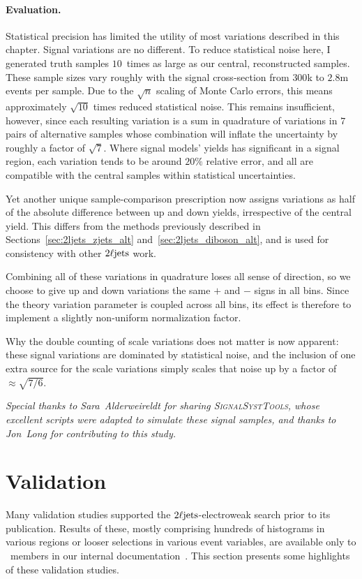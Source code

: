 \paragraph{Evaluation.}
Statistical precision has limited the utility of most variations described in
this chapter.
Signal variations are no different.
To reduce statistical noise here, I generated truth samples $10$~times as large
as our central, reconstructed samples.
These sample sizes vary roughly with the signal cross-section from $300$k to
$2.8$m events per sample.
Due to the $\sqrt{n}$ scaling of Monte Carlo errors, this means approximately
$\sqrt{10}$ times reduced statistical noise.
This remains insufficient, however, since each resulting variation is a
sum in quadrature of variations in $7$ pairs of alternative samples
whose combination will inflate the uncertainty by roughly a factor of
$\sqrt{7}$.
Where signal models' yields has significant in a signal region,
each variation tends to be around $20\%$ relative error,
and all are compatible with the central samples within statistical
uncertainties.

Yet another unique sample-comparison prescription now assigns variations as
half of the absolute difference between up and down yields, irrespective of the
central yield.
This differs from the methods previously described in
Sections~\ref{sec:2ljets_zjets_alt} and~\ref{sec:2ljets_diboson_alt},
and is used for consistency with other $2\ell\mathrm{jets}$ work.

Combining all of these variations in quadrature loses all sense of direction,
so we choose to give up and down variations the same $+$ and $-$ signs in all
bins.
Since the theory variation parameter is coupled across all bins, its effect is
therefore to implement a slightly non-uniform normalization factor.

Why the double counting of scale variations does not matter is now apparent:
these signal variations are dominated by statistical noise, and the inclusion
of one extra source for the scale variations simply scales that noise up by
a factor of $\approx \sqrt{7/6}$.

\emph{%
Special thanks to Sara~Alderweireldt for sharing \textsc{SignalSystTools},
whose excellent scripts were adapted to simulate these signal
samples, and thanks to Jon~Long for contributing to this study.
}

\section{Validation}
\label{sec:2ljets_validation}
Many validation studies supported the $2\ell\mathrm{jets}$-electroweak search prior to
its publication.
Results of these, mostly comprising hundreds of histograms in various regions
or looser selections in various event variables, are available only to \atlas\
members in our internal documentation~\cite{twoljets2018int}.
This section presents some highlights of these validation studies.


